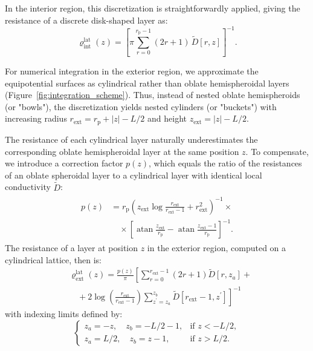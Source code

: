 \documentclass[10pt, a4paper, twocolumn]{article}
\begin{document}
In the interior region, this discretization is straightforwardly applied, giving the resistance of a discrete disk-shaped layer as:
\begin{equation}
    \varrho_{\text{int}}^{\text{lat}}(z) 
    =\left[\pi \sum_{r=0}^{r_{\text{p}}-1}(2r+1)\,\tilde{D}[r,z]\right]^{-1}.
\end{equation}

For numerical integration in the exterior region, we approximate the equipotential surfaces as cylindrical rather than oblate hemispheroidal layers (Figure~\ref{fig:integration_scheme}).
Thus, instead of nested oblate hemispheroids (or "bowls"), the discretization yields nested cylinders (or "buckets") with increasing radius $r_{\text{ext}} = r_{\text{p}} + |z| - L/2$ and height $z_{\text{ext}} = |z| - L/2$.

The resistance of each cylindrical layer naturally underestimates the corresponding oblate hemispheroidal layer at the same position $z$.
To compensate, we introduce a correction factor $p(z)$, which equals the ratio of the resistances of an oblate spheroidal layer to a cylindrical layer with identical local conductivity $\tilde{D}$:
\begin{gather}
    \label{eq:prefactor}
    \begin{aligned}
        p(z) &= r_{\text{p}} \left(z_{\text{ext}} \log{\frac{r_{\text{ext}}}{r_{\text{ext}} - 1}} + r_{\text{ext}}^{2}\right)^{-1} \times \\[4pt]
        &\quad\times\left[\operatorname{atan}{\frac{z_{\text{ext}}}{r_{\text{p}}}} - \operatorname{atan}{\frac{z_{\text{ext}} - 1}{r_{\text{p}}}}\right]^{-1}.
    \end{aligned}
\end{gather}
The resistance of a layer at position $z$ in the exterior region, computed on a cylindrical lattice, then is:
\begin{equation}
    \begin{aligned}
        &\varrho_{\text{ext}}^{\text{lat}}(z) = 
        \frac{p(z)}{\pi}\left[
        \sum_{r=0}^{r_{\text{ext}}-1}(2r+1)\tilde{D}[r,z_a]\right. + \\[4pt]
        &\quad+\left. 2 \log\left(\frac{r_{\text{ext}}}{r_{\text{ext}}\!-\! 1}\right)\sum_{z^{\prime}=z_{a}}^{z_{b}}\tilde{D}[r_{\text{ext}}\!-\!1,z^{\prime}]
        \right]^{-1}
    \end{aligned}
\end{equation}
with indexing limits defined by:
\begin{equation*}
    \begin{cases}
        z_{a} = -z,\quad z_{b} = -L/2-1,&\text{if } z < -L/2,\\[4pt]
        z_{a} = L/2,\quad z_{b} = z-1,&\text{if } z > L/2.
    \end{cases}
\end{equation*}
\end{document}
